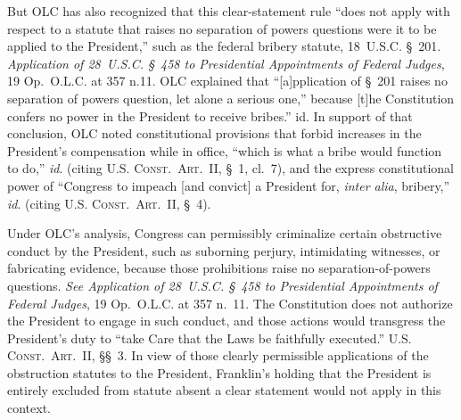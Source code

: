 But OLC has also recognized that this clear-statement rule ``does not apply with respect to a statute that raises no separation of powers questions were it to be applied to the President,'' such as the federal bribery statute, 18~U.S.C. \S~201.
\textit{Application of 28~U.S.C. \S~458 to Presidential Appointments of Federal Judges}, 19 Op.\ O.L.C. at 357 n.11. OLC explained that ``[a]pplication of \S~201 raises no separation of powers question, let alone a serious one,'' because [t]he Constitution confers no power in the President to receive bribes.'' id.
In support of that conclusion, OLC noted constitutional provisions that forbid increases in the President's compensation while in office, ``which is what a bribe would function to do,'' \textit{id}. (citing \textsc{U.S. Const.\ Art.~II}, \S~1, cl.~7), and the express constitutional power of ``Congress to impeach [and convict] a President for, \textit{inter alia}, bribery,'' \textit{id}. (citing \textsc{U.S. Const.\ Art.~II}, \S~4).

Under OLC's analysis, Congress can permissibly criminalize certain obstructive conduct by the President, such as suborning perjury, intimidating witnesses, or fabricating evidence, because those prohibitions raise no separation-of-powers questions.
\textit{See Application of 28~U.S.C. \S~458 to Presidential Appointments of Federal Judges}, 19 Op.\ O.L.C. at 357 n.~11.
The Constitution does not authorize the President to engage in such conduct, and those actions would transgress the President's duty to ``take Care that the Laws be faithfully executed.''
\textsc{U.S. Const.\ Art.~II}, \S\S~3.
In view of those clearly permissible applications of the obstruction statutes to the President, Franklin's holding that the President is entirely excluded from statute absent a clear statement would not apply in this context.

